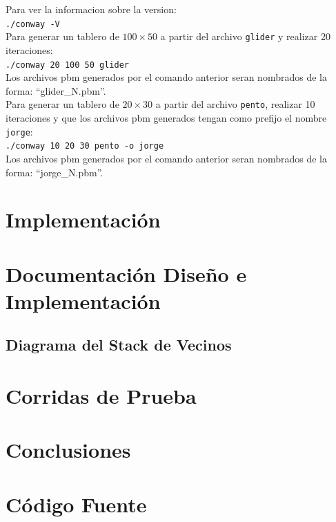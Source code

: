 \documentclass[11pt,a4paper]{article}
\begin{document}
Para ver la informacion sobre la version:\\

\texttt{./conway -V}\\

Para generar un tablero de $100 \times 50$ a partir del archivo \texttt{glider} y realizar 20 iteraciones:\\

\texttt{./conway 20 100 50 glider}\\

Los archivos pbm generados por el comando anterior seran nombrados de la forma: ``glider\_N.pbm''.\\

Para generar un tablero de $20 \times 30$ a partir del archivo \texttt{pento}, realizar 10 iteraciones y que los archivos pbm generados tengan como prefijo el nombre \texttt{jorge}:\\

\texttt{./conway 10 20 30 pento -o jorge}\\

Los archivos pbm generados por el comando anterior seran nombrados de la forma: ``jorge\_N.pbm''.

\section{Implementación}

\section{Documentación Diseño e Implementación}
\subsection{Diagrama del Stack de Vecinos}

\section{Corridas de Prueba}

\section{Conclusiones}

\section{Código Fuente}
\end{document}
